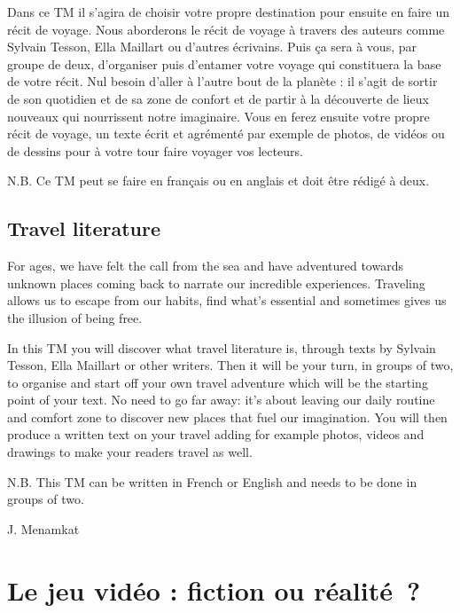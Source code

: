 \documentclass[
  10pt,
  french,
  a5paper,
  openany]{book}
\newenvironment{signature}{\begin{flushright}}{\end{flushright}}
\begin{document}
Dans ce TM il s'agira de choisir votre propre destination pour ensuite en faire un récit de voyage. Nous aborderons le récit de voyage à travers des auteurs comme Sylvain Tesson, Ella Maillart ou d'autres écrivains. Puis ça sera à vous, par groupe de deux, d'organiser puis d'entamer votre voyage qui constituera la base de votre récit. Nul besoin d'aller à l'autre bout de la planète : il s'agit de sortir de son quotidien et de sa zone de confort et de partir à la découverte de lieux nouveaux qui nourrissent notre imaginaire. Vous en ferez ensuite votre propre récit de voyage, un texte écrit et agrémenté par exemple de photos, de vidéos ou de dessins pour à votre tour faire voyager vos lecteurs.

N.B. Ce TM peut se faire en français ou en anglais et doit être rédigé à deux.

\hypertarget{travel-literature}{%
\section*{Travel literature}\label{travel-literature}}

For ages, we have felt the call from the sea and have adventured towards unknown places coming back to narrate our incredible experiences. Traveling allows us to escape from our habits, find what's essential and sometimes gives us the illusion of being free.

In this TM you will discover what travel literature is, through texts by Sylvain Tesson, Ella Maillart or other writers. Then it will be your turn, in groups of two, to organise and start off your own travel adventure which will be the starting point of your text. No need to go far away: it's about leaving our daily routine and comfort zone to discover new places that fuel our imagination. You will then produce a written text on your travel adding for example photos, videos and drawings to make your readers travel as well.

N.B. This TM can be written in French or English and needs to be done in groups of two.

\begin{signature}
J. Menamkat

\end{signature}

\hypertarget{le-jeu-viduxe9o-fiction-ou-ruxe9alituxe9}{%
\chapter{Le jeu vidéo : fiction ou réalité~?}\label{le-jeu-viduxe9o-fiction-ou-ruxe9alituxe9}}
\end{document}
